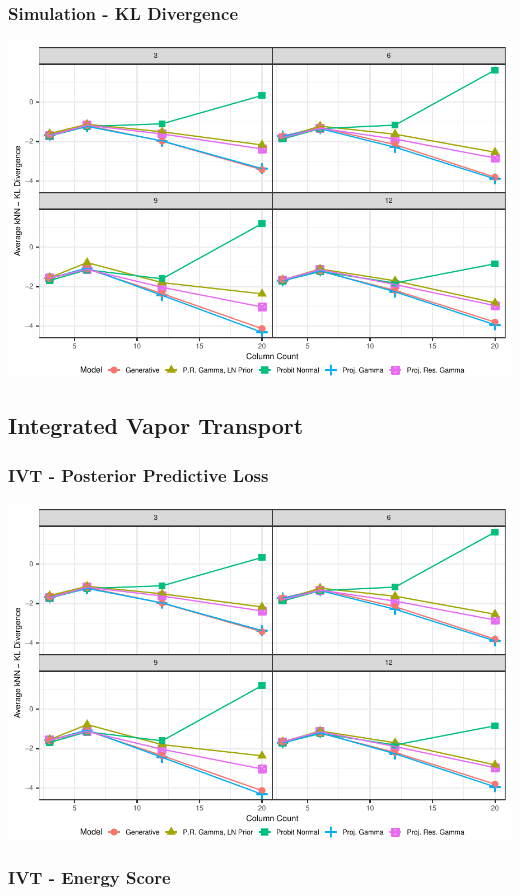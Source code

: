 \documentclass[aspectratio=169]{beamer}
\begin{document}
\begin{frame}
  \frametitle{Simulation - KL Divergence}
  \begin{center}
    \includegraphics[width=0.9\linewidth]{./images/simulation_knn_kld}
  \end{center}
\end{frame}

\subsection{Integrated Vapor Transport}
\begin{frame}
  \frametitle{IVT - Posterior Predictive Loss}
  \begin{center}
    \includegraphics[width=0.9\linewidth]{./images/simulation_knn_kld}
  \end{center}
\end{frame}

\begin{frame}
  \frametitle{IVT - Energy Score}
  \begin{center}
    
  \end{center}
\end{frame}
\end{document}
